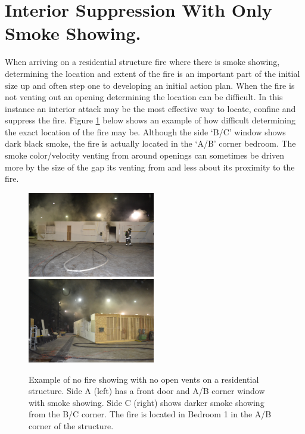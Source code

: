 \documentclass[12pt,oneside]{book}
\begin{document}
\section{Interior Suppression With Only Smoke Showing.} \label{tc:interior_attack_smoke_showing}

When arriving on a residential structure fire where there is smoke showing, determining the location and extent of the fire is an important part of the initial size up and often step one to developing an initial action plan. When the fire is not venting out an opening determining the location can be difficult. In this instance an interior attack may be the most effective way to locate, confine and suppress the fire. Figure \ref{fig:interior_attack_TC_smoke_showing} below shows an example of how difficult determining the exact location of the fire may be. Although the side `B/C' window shows dark black smoke, the fire is actually located in the `A/B' corner bedroom. The smoke color/velocity venting from around openings can sometimes be driven more by the size of the gap its venting from and less about its proximity to the fire. 

\begin{figure}[H]
\centering
\includegraphics[width=0.495\textwidth]{../0_Images/Tactical_Considerations/Interior_Attack/SIDE_A.jpg}
\includegraphics[width=0.495\textwidth]{../0_Images/Tactical_Considerations/Interior_Attack/SIDE_C.jpg}
\caption[Example - Smoke Showing - No Fire Showing]{Example of no fire showing with no open vents on a residential structure. Side A (left) has a front door and A/B corner window with smoke showing. Side C (right) shows darker smoke showing from the B/C corner. The fire is located in Bedroom 1 in the A/B corner of the structure.}
\label{fig:interior_attack_TC_smoke_showing}
\end{figure}
\end{document}
